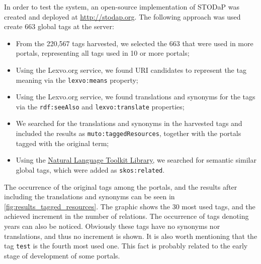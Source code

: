 In order to test the system, an open-source implementation of STODaP was created and deployed at \url{http://stodap.org}.
The following approach was used create 663 global tags at the server:
\begin{itemize}
	\item From the 220,567 tags harvested, we selected the 663 that were used in more portals, representing all tags used in 10 or more portals; 
	\item Using the Lexvo.org service, we found URI candidates to represent the tag meaning via the \texttt{lexvo:means} property;
	\item Using the Lexvo.org service, we found translations and synonyms for the tags via the \texttt{rdf:seeAlso} and \texttt{lexvo:translate} properties;
	\item We searched for the translations and synonyms in the harvested tags and included the results as \texttt{muto:taggedResources}, together with the portals tagged with the original term;
	\item Using the \href{http://www.nltk.org/}{Natural Language Toolkit  Library}, we searched for semantic similar global tags, which were added as \texttt{skos:related}.
\end{itemize}

The occurrence of the original tags among the portals, and the results after including the translations and synonyms can be seen in \autoref{fig:results_tagged_resources}. 
The graphic shows the 30 most used tags, and the achieved increment in the number of relations. 
The occurrence of tags denoting years can also be noticed.
Obviously these tags have no synonyms nor translations, and thus no increment is shown. 
It is also worth mentioning that the tag \texttt{{test}} is the fourth most used one.
This fact is probably related to the early stage of development of some portals. 

